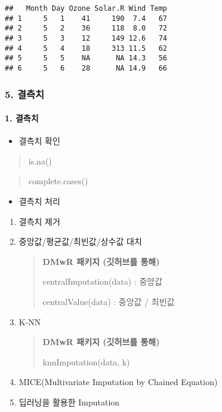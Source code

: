 \documentclass[
]{article}
\providecommand{\tightlist}{%
  \setlength{\itemsep}{0pt}\setlength{\parskip}{0pt}}
\begin{document}
\begin{verbatim}
##   Month Day Ozone Solar.R Wind Temp
## 1     5   1    41     190  7.4   67
## 2     5   2    36     118  8.0   72
## 3     5   3    12     149 12.6   74
## 4     5   4    18     313 11.5   62
## 5     5   5    NA      NA 14.3   56
## 6     5   6    28      NA 14.9   66
\end{verbatim}

\hypertarget{uxacb0uxce21uxce58}{%
\subsubsection{5. 결측치}\label{uxacb0uxce21uxce58}}

\hypertarget{uxacb0uxce21uxce58-1}{%
\paragraph{1. 결측치}\label{uxacb0uxce21uxce58-1}}

\begin{itemize}
\tightlist
\item
  결측치 확인
\end{itemize}

\begin{quote}
is.na()
\end{quote}

\begin{quote}
complete.cases()
\end{quote}

\begin{itemize}
\tightlist
\item
  결측치 처리
\end{itemize}

\begin{enumerate}
\def\labelenumi{\arabic{enumi}.}
\item
  결측치 제거
\item
  중앙값/평균값/최빈값/상수값 대치

  \begin{quote}
  \textbf{DMwR 패키지 (깃허브를 통해)}

  centralImputation(data) : 중앙값

  centralValue(data) : 중앙값 / 최빈값
  \end{quote}
\item
  K-NN

  \begin{quote}
  \textbf{DMwR 패키지 (깃허브를 통해)}

  knnImputation(data, k)
  \end{quote}
\item
  MICE(Multivariate Imputation by Chained Equation)
\item
  딥러닝을 활용한 Imputation
\end{enumerate}
\end{document}
